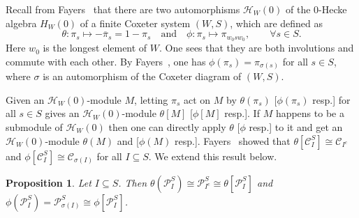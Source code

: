 \documentclass{amsart}
\newtheorem{proposition}[theorem]{Proposition}
\newtheorem*{Young's Rule}{Young's Rule}
\theoremstyle{definition}
\theoremstyle{remark}
\numberwithin{equation}{section}
\begin{document}
Recall from Fayers~\cite{Fayers} that there are two automorphisms ${\mathcal{H}}_W(0)$ of the $0$-Hecke algebra $H_W(0)$ of a finite Coxeter system $(W,S)$, which are defined as 
\[ \theta:\pi_s\mapsto -{\overline{\pi}}_s=1-\pi_s  {\quad\text{and}\quad} \phi:\pi_s\mapsto \pi_{w_0sw_0},\qquad \forall s\in S. \]
Here $w_0$ is the longest element of $W$. One sees that they are both involutions and commute with each other.  By Fayers~\cite{Fayers}, one has $\phi(\pi_s)=\pi_{\sigma(s)}$ for all $s\in S$, where $\sigma$ is an automorphism of the Coxeter diagram of $(W,S)$. 

Given an ${\mathcal{H}}_W(0)$-module $M$, letting $\pi_s$ act on $M$ by $\theta(\pi_s)$ [$\phi(\pi_s)$ resp.] for all $s\in S$ gives an ${\mathcal{H}}_W(0)$-module $\theta[M]$ [$\phi[M]$ resp.]. If $M$ happens to be a submodule of ${\mathcal{H}}_W(0)$ then one can directly apply $\theta$ [$\phi$ resp.] to it and get an ${\mathcal{H}}_W(0)$-module $\theta(M)$ and [$\phi(M)$ resp.]. Fayers~\cite{Fayers} showed that $\theta[{\mathcal{C}}_I^S] \cong {\mathcal{C}}_{I^c}$ and $\phi[{\mathcal{C}}_I^S] \cong {\mathcal{C}}_{\sigma(I)}$ for all $I\subseteq S$. We extend this result below.

\begin{proposition}\label{prop:AntiW}
Let $I\subseteq S$. Then $\theta({\mathcal{P}}_I^S) \cong {\mathcal{P}}_{I^c}^S \cong \theta[{\mathcal{P}}_I^S]$ and $\phi({\mathcal{P}}_I^S) = {\mathcal{P}}_{\sigma(I)}^S \cong \phi[{\mathcal{P}}_I^S]$.
\end{proposition}
\end{document}
